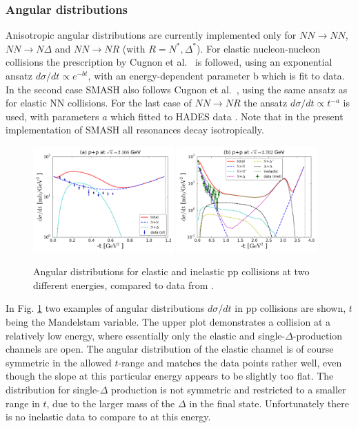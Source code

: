 \subsubsection{Angular distributions}
\label{sec:angular}

Anisotropic angular distributions are currently implemented only for
$NN\rightarrow NN$, $NN\rightarrow N\Delta$ and $NN\rightarrow NR$ (with
$R=N^*,\Delta^*$). For elastic nucleon-nucleon collisions the
prescription by Cugnon et al.~\cite{Cugnon:1996kh} is followed, using an exponential ansatz
$d\sigma/dt\propto e^{-bt}$, with an energy-dependent parameter b which is fit
to data. In the second case SMASH also follows Cugnon et al.~\cite{Cugnon:1996kh},
using the same ansatz as for elastic NN collisions. For the last case of
$NN\rightarrow NR$ the ansatz $d\sigma/dt\propto t^{-a}$ is used, with
parameters $a$ which fitted to HADES data \cite{Agakishiev:2014wqa}.
Note that in the present implementation of SMASH all resonances decay
isotropically.

\begin{figure}
  \centering
  \includegraphics[width=0.48\textwidth]{plots/smash/angular/pp_1.25/t.pdf}
  \includegraphics[width=0.48\textwidth]{plots/smash/angular/pp_2.8/t.pdf}
  \caption{Angular distributions for elastic and inelastic pp collisions
           at two different energies, compared to data from \cite{Bacon:1967zz,Ryan}.}
  \label{fig:angular}
\end{figure}

In Fig. \ref{fig:angular} two examples of angular distributions $d\sigma/dt$ in
pp collisions are shown, $t$ being the Mandelstam variable. The upper plot
demonstrates a collision at a relatively low energy, where essentially only the
elastic and single-$\Delta$-production channels are open. The angular
distribution of the elastic channel is of course symmetric in the allowed
$t$-range and matches the data points rather well, even though the slope at
this particular energy appears to be slightly too flat.  The distribution for
single-$\Delta$ production is not symmetric and restricted to a smaller range
in $t$, due to the larger mass of the $\Delta$ in the final state.
Unfortunately there is no inelastic data to compare to at this energy.

